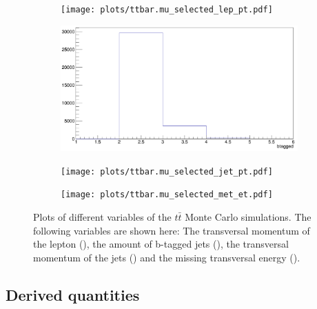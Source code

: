 \begin{figure}
  \begin{subfigure}{0.5\textwidth}
    \centering
    \texttt{[image: plots/ttbar.mu\_selected\_lep\_pt.pdf]}
    \caption{}
    \label{fig:lep_pt}
  \end{subfigure}%
  \begin{subfigure}{0.5\textwidth}
    \centering
    \includegraphics[width=\linewidth]{plots/btagged.png}
    \caption{}
    \label{fig:btagged}
  \end{subfigure}%
  \newline
  \begin{subfigure}{0.5\textwidth}
    \centering
    \texttt{[image: plots/ttbar.mu\_selected\_jet\_pt.pdf]}
    \caption{}
    \label{fig:jet_pt}
  \end{subfigure}%
  \begin{subfigure}{0.5\textwidth}
    \centering
    \texttt{[image: plots/ttbar.mu\_selected\_met\_et.pdf]}
    \caption{}
    \label{fig:met_et}
  \end{subfigure}%
  \caption{Plots of different variables of the $t\bar{t}$ Monte Carlo simulations.
  The following variables are shown here: The transversal momentum of the lepton (), the amount of b-tagged jets (), the transversal momentum of the jets () and the missing transversal energy ().
  }
  \label{fig:Distributions}
\end{figure}

\subsection{Derived quantities}

